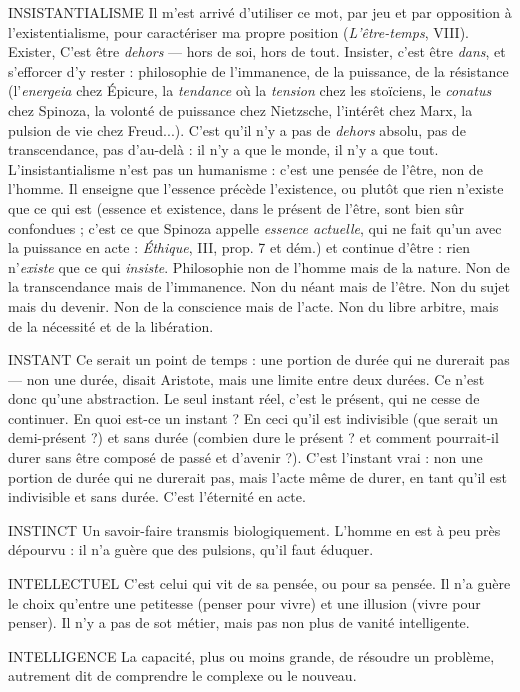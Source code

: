 INSISTANTIALISME Il m'est arrivé d’utiliser ce mot, par jeu et par opposition
à l’existentialisme, pour caractériser ma propre
position ({\it L'être-temps}, VIII). Exister, C’est être {\it dehors} — hors de soi, hors de
tout. Insister, c’est être {\it dans}, et s’efforcer d’y rester : philosophie de l’immanence,
de la puissance, de la résistance (l’{\it energeia} chez Épicure, la {\it tendance} où
la {\it tension} chez les stoïciens, le {\it conatus} chez Spinoza, la volonté de puissance
chez Nietzsche, l'intérêt chez Marx, la pulsion de vie chez Freud...). C’est qu’il
n’y a pas de {\it dehors} absolu, pas de transcendance, pas d’au-delà : il n’y a que le
monde, il n’y a que tout. L’insistantialisme n’est pas un humanisme : c’est une
pensée de l’être, non de l’homme. Il enseigne que l’essence précède l'existence,
ou plutôt que rien n'existe que ce qui est (essence et existence, dans le présent
de l'être, sont bien sûr confondues ; c’est ce que Spinoza appelle {\it essence
actuelle}, qui ne fait qu’un avec la puissance en acte : {\it Éthique}, III, prop. 7 et
dém.) et continue d’être : rien n'{\it existe} que ce qui {\it insiste}. Philosophie non de
l'homme mais de la nature. Non de la transcendance mais de l’immanence.
Non du néant mais de l’être. Non du sujet mais du devenir. Non de la conscience
mais de l’acte. Non du libre arbitre, mais de la nécessité et de la libération.

INSTANT Ce serait un point de temps : une portion de durée qui ne durerait
pas — non une durée, disait Aristote, mais une limite entre
deux durées. Ce n’est donc qu’une abstraction. Le seul instant réel, c’est le présent,
qui ne cesse de continuer. En quoi est-ce un instant ? En ceci qu'il est
indivisible (que serait un demi-présent ?) et sans durée (combien dure le
présent ? et comment pourrait-il durer sans être composé de passé et
d’avenir ?). C’est l'instant vrai : non une portion de durée qui ne durerait pas,
mais l'acte même de durer, en tant qu’il est indivisible et sans durée. C’est
l'éternité en acte.

INSTINCT Un savoir-faire transmis biologiquement. L'homme en est à
peu près dépourvu : il n’a guère que des pulsions, qu’il faut
éduquer.

INTELLECTUEL C'est celui qui vit de sa pensée, ou pour sa pensée. Il n’a
guère le choix qu’entre une petitesse (penser pour vivre)
et une illusion (vivre pour penser). Il n’y a pas de sot métier, mais pas non plus
de vanité intelligente.

INTELLIGENCE La capacité, plus ou moins grande, de résoudre un problème,
autrement dit de comprendre le complexe ou le
nouveau.

